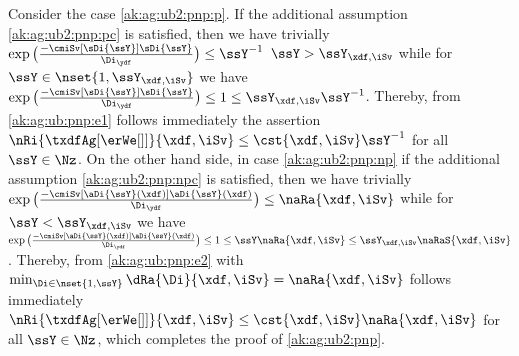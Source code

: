 \begin{pro}
  Consider the case \ref{ak:ag:ub2:pnp:p}.  If the additional
  assumption \ref{ak:ag:ub2:pnp:pc} is satisfied, then we have
  trivially
  $\exp\big(\tfrac{-\cmiSv[\sDi{\ssY}]\sDi{\ssY}}{\Di_{\ydf}}\big)\leq\ssY^{-1}$
  $\ssY> \ssY_{\xdf,\iSv}$ while for
  $\ssY\in\nset{1,\ssY_{\xdf,\iSv}}$ we have
  $\exp\big(\tfrac{-\cmiSv[\sDi{\ssY}]\sDi{\ssY}}{\Di_{\ydf}}\big)\leq1\leq
  \ssY_{\xdf,\iSv} \ssY^{-1}$. Thereby, from \eqref{ak:ag:ub:pnp:e1}
  follows immediately the assertion
  $\nRi{\txdfAg[{\erWe[]}]}{\xdf,\iSv} \leq \cst{\xdf,\iSv}\ssY^{-1}$
  for all $\ssY\in\Nz$. On the other hand side, in case
  \ref{ak:ag:ub2:pnp:np} if the additional assumption
  \ref{ak:ag:ub2:pnp:npc} is satisfied, then we have trivially
  $\exp\big(\tfrac{-\cmiSv[\aDi{\ssY}(\xdf)]\aDi{\ssY}(\xdf)}{\Di_{\ydf}}\big)\leq
  \naRa{\xdf,\iSv}$ while for $\ssY< \ssY_{\xdf,\iSv}$ we have
  $\exp\big(\tfrac{-\cmiSv[\aDi{\ssY}(\xdf)]\aDi{\ssY}(\xdf)}{\Di_{\ydf}}\big)\leq1\leq
  \ssY\naRa{\xdf,\iSv}\leq \ssY_{\xdf,\iSv}
  \naRaS{\xdf,\iSv}$. Thereby, from \eqref{ak:ag:ub:pnp:e2} with
  $\min_{\Di\in\nset{1,\ssY}}\dRa{\Di}{\xdf,\iSv}=\naRa{\xdf,\iSv}$
  follows immediately
  $ \nRi{\txdfAg[{\erWe[]}]}{\xdf,\iSv} \leq \cst{\xdf,\iSv}
  \naRa{\xdf,\iSv}$ for all $\ssY\in\Nz$, which completes the proof of
  \cref{ak:ag:ub2:pnp}.\proEnd
  \end{pro}
